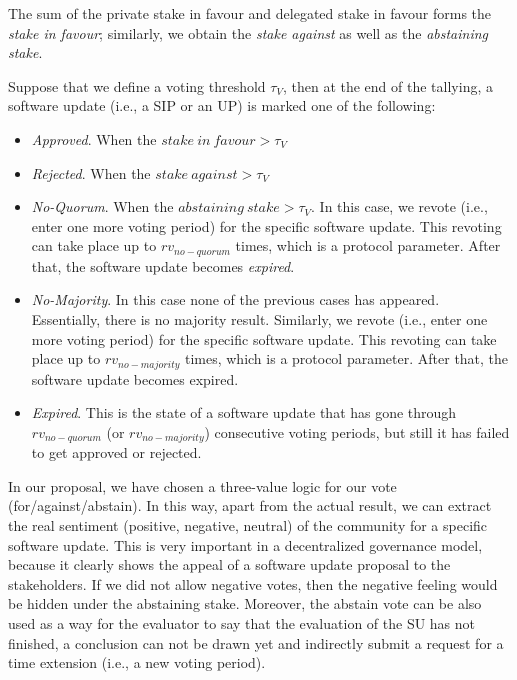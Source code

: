 The sum of the private stake in favour and delegated stake in favour forms the \emph{stake in favour}; similarly, we obtain the \emph{stake against} as well as the \emph{abstaining stake}.

Suppose that we define a voting threshold $\tau_V$, then at the end of the tallying, a software update (i.e., a SIP or an UP) is marked one of the following:
\begin{itemize}

\item \emph{Approved}. When the $stake\ in\ favour > \tau_V$

\item \emph{Rejected}. When the $stake\ against > \tau_V$

\item \emph{No-Quorum}. When the $abstaining\ stake > \tau_V$. In this case, we revote (i.e., enter one more voting period) for the specific software update. This revoting can take place up to $rv_{no-quorum}$ times, which is a protocol parameter. After that, the software update becomes \emph{expired}.

\item \emph{No-Majority}. In this case none of the previous cases has appeared. Essentially, there is no majority result. Similarly, we revote (i.e., enter one more voting period) for the specific software update. This revoting can take place up to $rv_{no-majority}$ times, which is a protocol parameter. After that, the software update becomes expired.

\item \emph{Expired}. This is the state of a software update that has gone through $rv_{no-quorum}$ (or $rv_{no-majority}$) consecutive voting periods, but still it has failed to get approved or rejected.
\end{itemize}

In our proposal, we have chosen a three-value logic for our vote (for/against/abstain). In this way, apart from the actual result, we can extract the real sentiment (positive, negative, neutral) of the community for a specific software update. This is very important in a decentralized governance model, because it clearly shows the appeal of a software update proposal to the stakeholders. If we did not allow negative votes, then the negative feeling would be hidden under the abstaining stake. 
Moreover, the abstain vote can be also used as a way for the evaluator to say that the evaluation of the SU has not finished, a conclusion can not be drawn yet and indirectly submit a request for a time extension (i.e., a new voting period).


